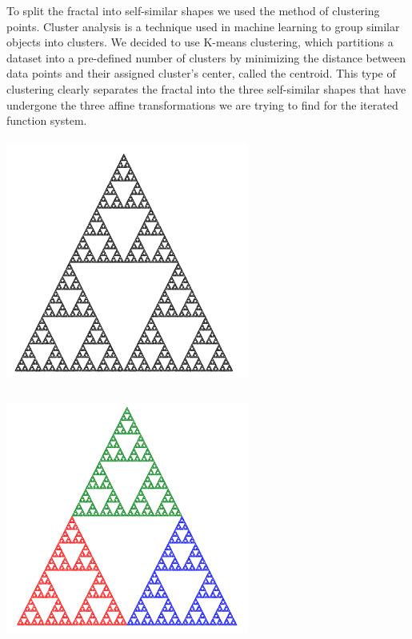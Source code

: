 \documentclass[a4paper,11pt, titlepage]{article}
\theoremstyle{definition}
\theoremstyle{plain}
\theoremstyle{remark}
\theoremstyle{definition}
\begin{document}
To split the fractal into self-similar shapes we used the method of clustering points. Cluster analysis is a technique used in machine learning to group similar objects into clusters. We decided to use K-means clustering, which partitions a dataset into a pre-defined number of clusters by minimizing the distance between data points and their assigned cluster’s center, called the centroid.\cite{sharma2019kmeans} This type of clustering clearly separates the fractal into the three self-similar shapes that have undergone the three affine transformations we are trying to find for the iterated function system.  

\begin{minipage}{0.45\textwidth}
       \includegraphics[width=8cm, height=8cm]{pic9.png}
   \end{minipage}
   \hfill
   \begin{minipage}{0.45\textwidth}
       \includegraphics[width=8cm, height=8cm]{pic8.png}
   \end{minipage}
\end{document}
